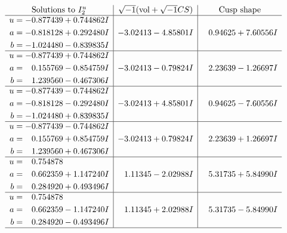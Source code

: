 \documentclass[1p]{elsarticle_modified}
\theoremstyle{definition}
\newcommand{\I}{\sqrt{-1}}
\begin{document}
$$\begin{array}{c|c|c}  
\text{Solutions to }I^u_{2}& \I (\text{vol} + \sqrt{-1}CS) & \text{Cusp shape}\\
 \hline 
\begin{aligned}
u &= -0.877439 + 0.744862 I \\
a &= -0.818128 + 0.292480 I \\
b &= -1.024480 - 0.839835 I\end{aligned}
 & -3.02413 - 4.85801 I & \phantom{-}0.94625 + 7.60556 I \\ \hline\begin{aligned}
u &= -0.877439 + 0.744862 I \\
a &= \phantom{-}0.155769 - 0.854759 I \\
b &= \phantom{-}1.239560 - 0.467306 I\end{aligned}
 & -3.02413 - 0.79824 I & \phantom{-}2.23639 - 1.26697 I \\ \hline\begin{aligned}
u &= -0.877439 - 0.744862 I \\
a &= -0.818128 - 0.292480 I \\
b &= -1.024480 + 0.839835 I\end{aligned}
 & -3.02413 + 4.85801 I & \phantom{-}0.94625 - 7.60556 I \\ \hline\begin{aligned}
u &= -0.877439 - 0.744862 I \\
a &= \phantom{-}0.155769 + 0.854759 I \\
b &= \phantom{-}1.239560 + 0.467306 I\end{aligned}
 & -3.02413 + 0.79824 I & \phantom{-}2.23639 + 1.26697 I \\ \hline\begin{aligned}
u &= \phantom{-}0.754878\phantom{ +0.000000I} \\
a &= \phantom{-}0.662359 + 1.147240 I \\
b &= \phantom{-}0.284920 + 0.493496 I\end{aligned}
 & \phantom{-}1.11345 - 2.02988 I & \phantom{-}5.31735 + 5.84990 I \\ \hline\begin{aligned}
u &= \phantom{-}0.754878\phantom{ +0.000000I} \\
a &= \phantom{-}0.662359 - 1.147240 I \\
b &= \phantom{-}0.284920 - 0.493496 I\end{aligned}
 & \phantom{-}1.11345 + 2.02988 I & \phantom{-}5.31735 - 5.84990 I\\
 \hline 
 \end{array}$$\newpage
\end{document}
